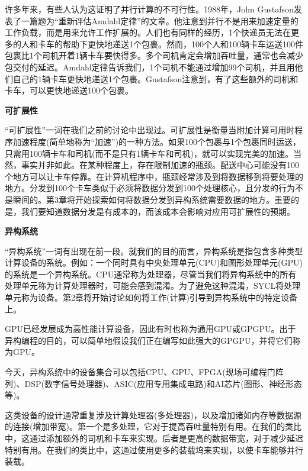 许多年来，有些人认为这证明了并行计算的不可行性。1988年，John Gustafson发表了一篇题为“重新评估Amdahl定律”的文章。他注意到并行不是用来加速定量的工作负载，而是用来允许工作扩展的。人们也有同样的经历，1个快递员无法在更多的人和卡车的帮助下更快地递送1个包裹。然而，100个人和100辆卡车运送100件包裹比1个司机开着1辆卡车要快得多。多个司机肯定会增加吞吐量，通常也会减少包交付的延迟。Amdahl定律告诉我们，1个司机不能通过增加99个司机，并且用他们自己的1辆卡车更快地递送1个包裹。Gustafson注意到，有了这些额外的司机和卡车，可以更快地递送100个包裹。\par

\hspace*{\fill} \par %
\textbf{可扩展性}

“可扩展性”一词在我们之前的讨论中出现过。可扩展性是衡量当附加计算可用时程序加速程度(简单地称为“加速”)的一种方法。如果100个包裹与1个包裹同时运送，只需用100辆卡车和司机(而不是只有1辆卡车和司机)，就可以实现完美的加速。当然，事实并非如此。在某种程度上，存在限制加速的瓶颈。配送中心可能没有100个地方可以让卡车停靠。在计算机程序中，瓶颈经常涉及到将数据移到将要处理的地方。分发到100个卡车类似于必须将数据分发到100个处理核心，且分发的行为不是瞬间的。第3章将开始探索如何将数据分发到异构系统需要数据的地方。重要的是，我们要知道数据分发是有成本的，而该成本会影响对应用可扩展性的预期。\par

\hspace*{\fill} \par %
\textbf{异构系统}

“异构系统”一词有出现在前一段。就我们的目的而言，异构系统是指包含多种类型计算设备的系统。例如：一个同时具有中央处理单元(CPU)和图形处理单元(GPU)的系统是一个异构系统。CPU通常称为处理器，尽管当我们将异构系统中的所有处理单元称为计算处理器时，可能会感到混淆。为了避免这种混淆，SYCL将处理单元称为设备。第2章将开始讨论如何将工作(计算)引导到异构系统中的特定设备上。\par

GPU已经发展成为高性能计算设备，因此有时也称为通用GPU或GPGPU。出于异构编程的目的，可以简单地假设我们正在编写如此强大的GPGPU，并将它们称为GPU。\par

今天，异构系统中的设备集合可以包括CPU、GPU、FPGA(现场可编程门阵列)、DSP(数字信号处理器)、ASIC(应用专用集成电路)和AI芯片(图形、神经形态等)。\par

这类设备的设计通常重复涉及计算处理器(多处理器)，以及增加诸如内存等数据源的连接(增加带宽)。第一个是多处理，它对于提高吞吐量特别有用。在我们的类比中，这通过添加额外的司机和卡车来实现。后者是更高的数据带宽，对于减少延迟特别有用。在我们的类比中，这通过使用更多的装载坞来实现，以使卡车能够并行装载。\par

